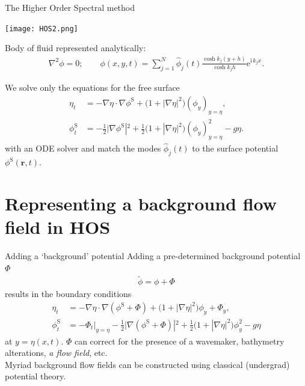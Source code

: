 \documentclass{sintefbeamer}
\newcommand{\mr}{\mathrm}
\renewcommand{\S}{^\mr{S}}
\newcommand{\ii}{\mr{i}\,}
\newcommand{\ee}{\mr{e}}
\renewcommand{\_}[1]{_\mr{#1}}
\begin{document}
\begin{frame}{The Higher Order Spectral method}
\vspace{-1cm}
\begin{center}
\texttt{[image: HOS2.png]}
\end{center}

Body of fluid represented analytically:
\begin{align*}
\nabla^2\phi = 0;\qquad  \phi(x,y,t) = \sum_{j=1}^N \hat\phi_j(t) \frac{\cosh k_j(y+h)}{\cosh k_j h} \ee^{\ii k_j x}.
\end{align*}

We solve only the equations for the free surface 
\begin{align*}
\eta_t &=   - \nabla\eta\cdot\nabla\phi\S     + \big(1+|\nabla\eta|^2\big)(\phi_y)_{y=\eta}, %
\\
\phi\S_t &= - \frac12\big|\nabla\phi\S|^2 + \frac12\big(1+|\nabla\eta|^2\big)(\phi_y)_{y=\eta}^2 - g\eta.
\end{align*}
with an ODE solver and match the modes $\hat\phi_j(t) $ to the surface potential $\phi\S(\bm r,t)$.
\end{frame}


\section{Representing a background flow field in HOS}

\begin{frame}{Adding a `background' potential}
	\vspace{-5mm}
	Adding a  pre-determined background potential $\Phi$
	\begin{align*}
		\tilde\phi = \phi + \Phi
	\end{align*}
	results in the boundary conditions
	\begin{align*}
		\eta_t &=   - \nabla\eta\cdot\nabla(\phi\S +\Phi)  + \big(1+|\nabla\eta|^2\big)\phi_y + \Phi_y,
		\\
		\phi\S_t &= -\Phi_t\big|_{y=\eta} - \frac12\big|\nabla(\phi\S +\Phi)|^2 + \frac12\big(1+|\nabla\eta|^2\big)\phi_y^2 - g \eta
	\end{align*}
	at $y=\eta(x,t)$.
	$\Phi$ can correct for the presence of a wavemaker, bathymetry alterations, \textit{a flow field}, etc. \\
	
	Myriad background flow fields can be constructed using classical (undergrad) potential theory.	
\end{frame}
\end{document}
